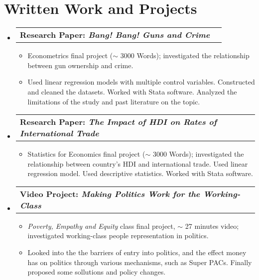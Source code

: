 \documentclass[letterpaper,11pt]{article}
\makeatletter
\newcommand{\resumeItem}[1]{
  \item\small{
    {#1 \vspace{-2pt}}
  }
}
\newcommand{\resumeProjectHeading}[2]{
    \vspace{-2pt}\item
    \begin{tabular*}{0.97\textwidth}{l@{\extracolsep{\fill}}r}
      \small#1 & \small#2 \\
    \end{tabular*}\vspace{-7pt}
}
\newcommand{\resumeSubHeadingListStart}{\begin{itemize}[leftmargin=0.15in, label={}]}
\newcommand{\resumeSubHeadingListEnd}{\end{itemize}}
\newcommand{\resumeItemListStart}{\begin{itemize}}
\newcommand{\resumeItemListEnd}{\end{itemize}\vspace{-5pt}}
\makeatother
\begin{document}
    

      




\section{Written Work and Projects}
    \vspace{3pt}
    \resumeSubHeadingListStart
      
      \resumeProjectHeading
        {\textbf{Research Paper: \textit{Bang! Bang! Guns and Crime}}} {}
          \resumeItemListStart
            \resumeItem{Econometrics final project ($\sim$ 3000 Words); investigated the relationship between gun ownership and crime. }
            \resumeItem{Used linear regression models with multiple control variables. Constructed and cleaned the datasets. Worked with Stata software. Analyzed the limitations of the study and past literature on the topic.}

            \resumeItemListEnd

      \resumeProjectHeading
      {\textbf{Research Paper: \textit{The Impact of HDI on Rates of International Trade}}} {}
      \resumeItemListStart
          \resumeItem{Statistics for Economics final project ($\sim$ 3000 Words); investigated the relationship between country's HDI and international trade. Used linear regression model. Used descriptive statistics. Worked with Stata software.}
        \resumeItemListEnd
      
        \resumeProjectHeading
        {\textbf{Video Project: \textit{Making Politics Work for the Working-Class}}} {}
        \resumeItemListStart
            \resumeItem{\textit{Poverty, Empathy and Equity} class final project, $\sim$ 27 minutes video; investigated working-class people representation in politics.}
            \resumeItem{Looked into the the barriers of entry into politics, and the effect money has on politics through various mechanisms, such as Super PACs. Finally proposed some sollutions and policy changes.}
          \resumeItemListEnd
    \resumeSubHeadingListEnd
\end{document}
